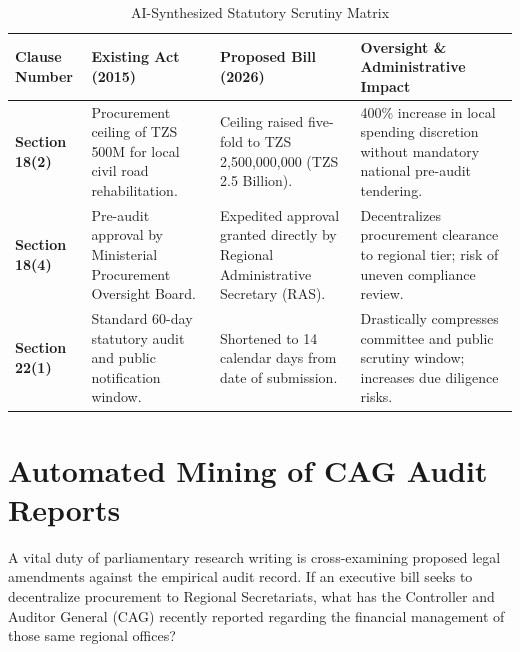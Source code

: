 \documentclass[11pt, a4paper]{report}
\begin{document}
\begin{table}[htbp]
\centering
\caption{AI-Synthesized Statutory Scrutiny Matrix}
\vspace{0.2cm}
\begin{tabular}{@{}>{\bfseries}p{2.6cm}p{3.4cm}p{3.6cm}p{4.4cm}@{}}
\toprule
Clause Number & Existing Act (2015) & Proposed Bill (2026) & Oversight \& Administrative Impact \\
\midrule
Section 18(2) & Procurement ceiling of TZS 500M for local civil road rehabilitation. & Ceiling raised five-fold to TZS 2,500,000,000 (TZS 2.5 Billion). & 400\% increase in local spending discretion without mandatory national pre-audit tendering. \\
\addlinespace
Section 18(4) & Pre-audit approval by Ministerial Procurement Oversight Board. & Expedited approval granted directly by Regional Administrative Secretary (RAS). & Decentralizes procurement clearance to regional tier; risk of uneven compliance review. \\
\addlinespace
Section 22(1) & Standard 60-day statutory audit and public notification window. & Shortened to 14 calendar days from date of submission. & Drastically compresses committee and public scrutiny window; increases due diligence risks. \\
\bottomrule
\end{tabular}
\end{table}

\newpage

\section{Automated Mining of CAG Audit Reports}
A vital duty of parliamentary research writing is cross-examining proposed legal amendments against the empirical audit record. If an executive bill seeks to decentralize procurement to Regional Secretariats, what has the Controller and Auditor General (CAG) recently reported regarding the financial management of those same regional offices?
\end{document}
